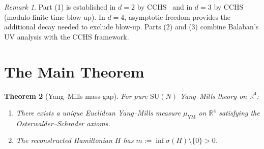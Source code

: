 \documentclass[11pt,a4paper]{article}
\theoremstyle{plain}
\newtheorem{theorem}{Theorem}[section]
\theoremstyle{definition}
\theoremstyle{remark}
\newtheorem{remark}[theorem]{Remark}
\newcommand{\R}{\mathbb{R}}
\newcommand{\SU}{\mathrm{SU}}
\begin{document}
\begin{remark}
Part (1) is established in $d = 2$ by CCHS~\cite{CCHS2020} and
in $d = 3$ by CCHS~\cite{CCHS2022,CCHS2024} (modulo finite-time
blow-up). In $d = 4$, asymptotic freedom provides the additional
decay needed to exclude blow-up. Parts (2) and (3) combine
Balaban's UV analysis with the CCHS framework.
\end{remark}

\section{The Main Theorem}

\begin{theorem}[Yang--Mills mass gap]\label{thm:main}
For pure $\SU(N)$ Yang--Mills theory on $\R^4$:
\begin{enumerate}[label=(\roman*)]
\item There exists a unique Euclidean Yang--Mills measure $\mu_{\mathrm{YM}}$
  on $\R^4$ satisfying the Osterwalder--Schrader axioms.
\item The reconstructed Hamiltonian $H$ has
  $m := \inf\sigma(H) \setminus \{0\} > 0$.
\end{enumerate}
\end{theorem}
\end{document}
